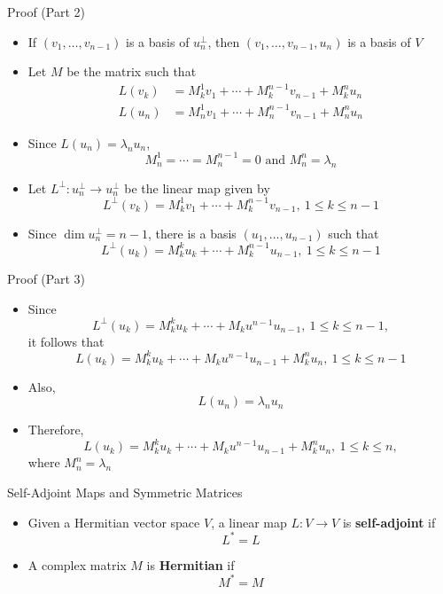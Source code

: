 \documentclass[usenames,dvipsnames,10pt]{beamer}
\begin{document}
\begin{frame}
  {Proof (Part 2)}

  \begin{itemize}
  \item If $(v_1, \dots, v_{n-1})$ is a basis of $u_n^\perp$, then $(v_1, \dots, v_{n-1},u_n)$ is a basis of $V$
  \item Let $M$ be the matrix such that
    \begin{align*}
      L(v_k) &= M_k^1v_1 + \cdots + M_k^{n-1}v_{n-1} + M_k^nu_n\\
      L(u_n) &= M_n^1v_1 + \cdots + M_n^{n-1}v_{n-1} + M^n_nu_n
    \end{align*}
  \item Since $L(u_n) = \lambda_nu_n$,
    \[
      M_n^1 = \cdots = M_n^{n-1} = 0\text{ and }M_n^n = \lambda_n
    \]
  \item Let $L^\perp: u_n^\perp \rightarrow u_n^\perp$ be the linear map given by
    \[
      L^\perp(v_k) = M_k^1v_1 + \cdots + M_k^{n-1}v_{n-1},\ 1 \le k \le n-1
    \]
  \item Since $\dim u_n^\perp = n-1$, there is a basis $(u_1, \dots, u_{n-1})$ such that
    \[
      L^\perp(u_k) = M_k^ku_k + \cdots + M_k^{n-1}u_{n-1},\ 1 \le k \le n-1
    \]
  \end{itemize}
\end{frame}

\begin{frame}
  {Proof (Part 3)}

  \begin{itemize}
  \item Since
    \[
      L^\perp(u_k) = M_k^ku_k + \cdots + M_ku^{n-1}u_{n-1},\ 1 \le k \le n-1,
    \]
    it follows that
    \[
      L(u_k) = M_k^ku_k + \cdots + M_ku^{n-1}u_{n-1} + M_k^nu_n,\ 1 \le k \le n-1
    \]
  \item Also,
    \[
      L(u_n) = \lambda_nu_n
    \]
  \item Therefore,
    \[
      L(u_k) = M_k^ku_k + \cdots + M_ku^{n-1}u_{n-1} + M_k^nu_n,\ 1 \le k \le n,
    \]
    where $M^n_n = \lambda_n$
  \end{itemize}
\end{frame}

\begin{frame}
  {Self-Adjoint Maps and Symmetric Matrices}

  \begin{itemize}
  \item Given a Hermitian vector space $V$, a linear map $L: V \rightarrow V$ is {\bf self-adjoint} if
    \[
      L^* = L
    \]
  \item A complex matrix $M$ is {\bf Hermitian} if
    \[
      M^* = M
    \]
  \end{itemize}
\end{frame}
\end{document}
